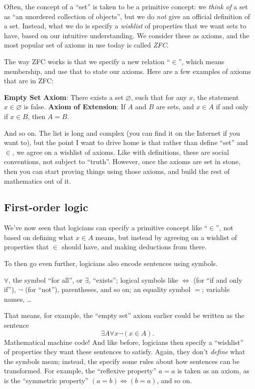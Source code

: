 \documentclass[11pt]{scrartcl}
\begin{document}
Often, the concept of a ``set'' is taken to be a primitive concept:
we \emph{think of} a set as ``an unordered collection of objects'',
but we do \emph{not} give an official definition of a set.
Instead, what we do is specify a \emph{wishlist} of properties that
we want sets to have, based on our intuitive understanding.
We consider these as axioms,
and the most popular set of axioms in use today is called \emph{ZFC}.

The way ZFC works is that we specify a new relation ``$\in$'',
which means membership, and use that to state our axioms.
Here are a few examples of axioms that are in ZFC:
\begin{itemize}
  \ii \textbf{Empty Set Axiom}:
  There exists a set $\varnothing$, such that for any $x$,
  the statement $x \in \varnothing$ is false.
  \ii \textbf{Axiom of Extension}:
  If $A$ and $B$ are sets, and $x \in A$ if and only if $x \in B$,
  then $A = B$.
\end{itemize}
And so on.
The list is long and complex (you can find it on the Internet if you want to),
but the point I want to drive home is that
\alert{rather than define ``set'' and $\in$, we agree on a wishlist of axioms}.
Like with definitions, these are social conventions, not subject to ``truth''.
However, once the axioms are set in stone,
then you can start proving things using those axioms,
and build the rest of mathematics out of it.

\subsection{First-order logic}
We've now seen that logicians can specify a primitive concept like ``$\in$'',
not based on defining what $x \in A$ means,
but instead by agreeing on a wishlist of properties that $\in$ should have,
and making deductions from there.

To then go even further, logicians also encode sentences using symbols.
\begin{itemize}
  \ii $\forall$, the symbol ``for all'', or $\exists$, ``exists'';
  \ii logical symbols like $\iff$ (for ``if and only if''),
  $\neg$ (for ``not''), parentheses, and so on;
  \ii an equality symbol $=$;
  \ii variable names,
  \ii \dots
\end{itemize}
That means, for example, the ``empty set'' axiom earlier could be written as
the sentence
\[ \exists A \forall x \neg (x \in A). \]
Mathematical machine code!
And like before, logicians then specify a ``wishlist'' of properties
they want these sentences to satisfy.
Again, they don't \emph{define} what the symbols mean;
instead, the specify some rules about how sentences can be transformed.
For example, the ``reflexive property'' $a=a$ is taken as an axiom,
as is the ``symmetric property'' $(a=b) \iff (b=a)$, and so on.
\end{document}
